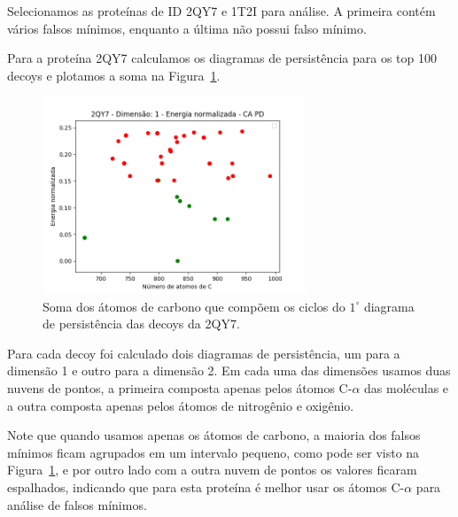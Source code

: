 Selecionamos as proteínas de ID 2QY7 e 1T2I para análise. A primeira contém vários falsos mínimos,
enquanto a última não possui falso mínimo.

Para a proteína 2QY7 calculamos os diagramas de persistência para os top 100 decoys e plotamos a
soma na Figura~\ref{fig:cyc2qy7}.

\begin{figure}[!htbp]
    \centering
    \includegraphics[width=0.7\textwidth]{beamer/images/cyc2qy7.png}
    \caption{Soma dos átomos de carbono que compõem os ciclos do
            $1^\circ$ diagrama de persistência das decoys da 2QY7.}
    \label{fig:cyc2qy7}
    \fautor
\end{figure}

Para cada decoy foi calculado dois diagramas de persistência, um para a dimensão 1 e outro para a dimensão 2.
Em cada uma das dimensões usamos duas nuvens de pontos, a primeira composta apenas pelos átomos C-$\alpha$
das moléculas e a outra composta apenas pelos átomos de nitrogênio e oxigênio.

Note que quando usamos apenas os átomos de carbono, a maioria dos falsos mínimos ficam agrupados em um intervalo
pequeno, como pode ser visto na Figura~\ref{fig:cyc2qy7}, e por outro lado com a outra nuvem de pontos os valores
ficaram espalhados, indicando que para esta proteína é melhor usar os átomos C-$\alpha$ para análise de falsos
mínimos.

